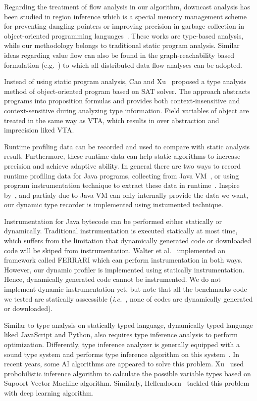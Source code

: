 \documentclass{fac}
\newcommand\ie{\textit{i.e.\ }}
\begin{document}
Regarding the treatment of flow analysis in our algorithm, downcast analysis has been studied in region inference which is a special memory management scheme for preventing dangling pointers or improving precision in garbage collection in object-oriented programming languages~\cite{Boyapati2003,Chin2004}.  These works are type-based analysis, while our methodology belongs to traditional static program analysis. Similar ideas regarding value flow can also be found in the graph-reachability based formulation (e.g.~\cite{Reps1997,Lu2013}) to which all distributed data flow analyses can be adopted.

Instead of using static program analysis, Cao and Xu~\cite{Cao2009} proposed a type analysis method of object-oriented program based on SAT solver. The approach abstracts programs into proposition formulas and provides both context-insensitive and context-sensitive during analyzing type information. Field variables of object are treated in the same way as VTA, which results in over abstraction and imprecision liked VTA.

Runtime profiling data can be recorded and used to compare with static analysis result. Furthermore, these runtime data can help static algorithms to increase precision and achieve adaptive ability. In general there are two ways to record runtime profiling data for Java programs, collecting from Java VM~\cite{Codrut2014}, or using program instrumentation technique to extract these data in runtime~\cite{Sundaresan2000}. Inspire by~\cite{Sundaresan2000}, and partialy due to Java VM can only internally provide the data we want, our dynamic type recorder is implemented using instumented technique.

Instrumentation for Java bytecode can be performed either statically or dynamically. Traditional instrumentation is executed statically at most time, which suffers from the limitation that dynamically generated code or downloaded code will be skiped from instrumentation. Walter et al.~\cite{Binder2007} implemented an framework called FERRARI which can perform instrumentation in both ways. However, our dynamic profiler is implemented using statically instrumentation. Hence, dynamically generated code cannot be instrumented. We do not implement dynamic instrumentation yet, but note that all the benchmarks code we tested are statically asscessible (\ie, none of codes are dynamically generated or downloaded).

Similar to type analysis on statically typed language, dynamically typed language liked JavaScript and Python, also requires type inference analysis to perform optimization. Differently, type inference analyzer is generally equipped with a sound type system and performs type inference algorithm on this system~\cite{Chandra2016}. In recent years, some AI algorithms are appeared to solve this problem. Xu~\cite{Xu2016} used probobilistic inference algorithm to calculate the possible variable types based on Supoort Vector Machine algorithm. Similarly, Hellendoorn~\cite{Hellendoorn2018} tackled this problem with deep learning algorithm.
\end{document}
